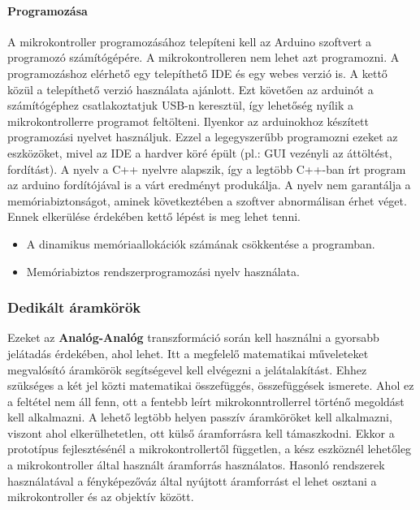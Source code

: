 \paragraph{Programozása}
A mikrokontroller programozásához telepíteni kell az Arduino szoftvert a programozó számítógépére. A mikrokontrolleren nem lehet azt programozni. A programozáshoz elérhető egy telepíthető IDE és egy webes verzió is. A kettő közül a telepíthető verzió használata ajánlott. Ezt követően az arduinót a számítógéphez csatlakoztatjuk USB-n keresztül, így lehetőség nyílik a mikrokontrollerre programot feltölteni. \cite{monk2023programming} Ilyenkor az arduinokhoz készített programozási nyelvet használjuk. Ezzel a legegyszerűbb programozni ezeket az eszközöket, mivel az IDE a hardver köré épült (pl.: GUI vezényli az áttöltést, fordítást). A nyelv a C++ nyelvre alapszik, így a legtöbb C++-ban írt program az arduino fordítójával is a várt eredményt produkálja. A nyelv nem garantálja a memóriabiztonságot, aminek következtében a szoftver abnormálisan érhet véget. Ennek elkerülése érdekében kettő lépést is meg lehet tenni.
\begin{itemize}
    \item A dinamikus memóriaallokációk számának csökkentése a programban.
    \item Memóriabiztos rendszerprogramozási nyelv használata.
\end{itemize}


\subsubsection{Dedikált áramkörök}
Ezeket az \textbf{Analóg-Analóg} transzformáció során kell használni a gyorsabb jelátadás érdekében, ahol lehet. Itt a megfelelő matematikai műveleteket megvalósító áramkörök segítségevel kell elvégezni a jelátalakítást. Ehhez szükséges a két jel közti matematikai összefüggés, összefüggések ismerete. Ahol ez a feltétel nem áll fenn, ott a fentebb leírt mikrokonntrollerrel történő megoldást kell alkalmazni. A lehető legtöbb helyen passzív áramköröket kell alkalmazni, viszont ahol elkerülhetetlen, ott külső áramforrásra kell támaszkodni. Ekkor a prototípus fejlesztésénél a mikrokontrollertől független, a kész eszköznél lehetőleg a mikrokontroller által használt áramforrás használatos. Hasonló rendszerek használatával a fényképezőváz által nyújtott áramforrást el lehet osztani a mikrokontroller és az objektív között.

